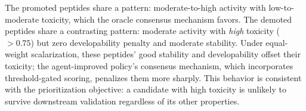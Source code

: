 The promoted peptides share a pattern: moderate-to-high activity with low-to-moderate toxicity, which the oracle consensus mechanism favors.
The demoted peptides share a contrasting pattern: moderate activity with \emph{high} toxicity ($>0.75$) but zero developability penalty and moderate stability.
Under equal-weight scalarization, these peptides' good stability and developability offset their toxicity; the agent-improved policy's consensus mechanism, which incorporates threshold-gated scoring, penalizes them more sharply.
This behavior is consistent with the prioritization objective: a candidate with high toxicity is unlikely to survive downstream validation regardless of its other properties.
